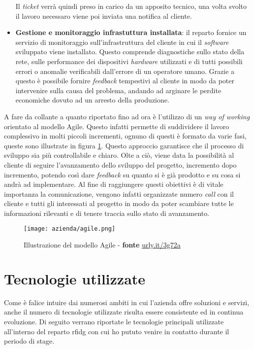 \begin{itemize}
    Il \emph{ticket} verrà quindi preso in carico da un apposito tecnico, una volta svolto il lavoro necessaro viene poi inviata una notifica al cliente. 
    \item \textbf{Gestione e monitoraggio infrastuttura installata}: il reparto fornice un servizio di monitoraggio sull'infrastruttura del cliente in cui il
    \emph{software} sviluppato viene installato. Questo comprende diagnostiche sullo stato della rete, sulle performance dei dispositivi \emph{hardware}
    utilizzati e di tutti possibili errori o anomalie verificabili dall'errore di un operatore umano. Grazie a questo è possibile fornire \emph{feedback}
    tempestivi al cliente in modo da poter intervenire sulla causa del problema, andando ad arginare le perdite economiche dovuto ad un arresto della produzione.
\end{itemize} 

A fare da collante a quanto riportato fino ad ora è l'utilizzo di un \emph{way of working} orientato al modello Agile. Questo infatti permette di
suddividere il lavoro complessivo in molti piccoli incrementi, ognuno di questi è formato da varie fasi, queste sono illustrate in figura \ref{agile_example}. 
Questo approccio garantisce che il processo di sviluppo sia più controllabile e chiaro. 
Olte a ciò, viene data la possibilità al cliente di seguire l'avanzamento dello sviluppo del progetto, incremento dopo incremento, potendo così 
dare \emph{feedback} su quanto si è già prodotto e su cosa si andrà ad implementare.
Al fine di raggiungere questi obiettivi è di vitale importanza la comunicazione, vengono infatti organizzate numero \emph{call} con il cliente e tutti gli
interessati al progetto in modo da poter scambiare tutte le informazioni rilevanti e di tenere traccia sullo stato di avanzamento.

\begin{figure}[!h] 
    \centering 
    \texttt{[image: azienda/agile.png]} 
    \caption{Illustrazione del modello Agile - \textbf{fonte} \url{urly.it/3g72a}}
    \label{agile_example}
\end{figure}

\section{Tecnologie utilizzate}

Come è falice intuire dai numerosi ambiti in cui l'azienda offre soluzioni e servizi, anche il numero di tecnologie utilizzate risulta essere consistente
ed in continua evoluzione. Di seguito verrano riportate le tecnologie principali utilizzate all'interno del reparto \gls{rfidg} con cui ho pututo venire in contatto
durante il periodo di stage.

